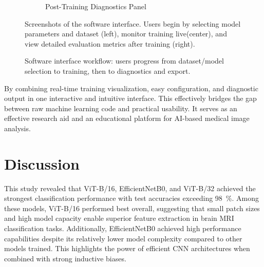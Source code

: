 \documentclass[11pt]{article}
\begin{document}
\begin{figure}[H]
\begin{subfigure}[t]{0.32\textwidth}
\caption{Post-Training Diagnostics Panel}
\label{fig:gui-window3}
\end{subfigure}

\caption{Screenshots of the software interface. Users begin by selecting model parameters and dataset (left), monitor training live(center), and view detailed evaluation metrics after training (right).}
\label{fig:gui-windows}
\end{figure}

\begin{figure}[H]
\centering
{}
\caption{Software interface workflow: users progress from dataset/model selection to training, then to diagnostics and export.}
\label{fig:gui-workflow}
\end{figure}

By combining real-time training visualization, easy configuration, and diagnostic output in one interactive and intuitive interface. This effectively bridges the gap between raw machine learning code and practical usability. It serves as an effective research aid and an educational platform for AI-based medical image analysis.


\section{Discussion}

This study revealed that ViT-B/16, EfficientNetB0, and ViT-B/32 achieved the strongest classification performance with test accuracies exceeding 98~\%. Among these models, ViT-B/16 performed best overall, suggesting that small patch sizes and high model capacity enable superior feature extraction in brain MRI classification tasks. Additionally, EfficientNetB0 achieved high performance capabilities despite its relatively lower model complexity compared to other models trained. This highlights the power of efficient CNN architectures when combined with strong inductive biases.
\end{document}

